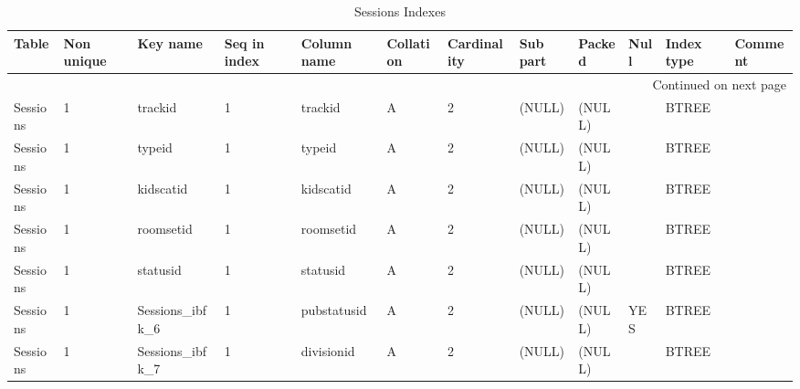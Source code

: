 \documentclass[tablesignature,landscape]{scrartcl}
\begin{document}
\begin{longtable}{|l|l|l|l|l|l|l|l|l|l|l|l|}
\caption{Sessions Indexes} \label{tbl:sessionsindexes}\\
\hline
 Table     &  Non unique  &  Key name               &  Seq in index  &  Column name  &  Collation  &  Cardinality  &  Sub part  &  Packed  &  Null  &  Index type  &  Comment \\
\hline
\endhead
\hline\multicolumn{12}{r}{Continued on next page}\
\endfoot
\endlastfoot
\hline
 Sessions  &           0  &  PRIMARY                &             1  &  sessionid    &  A          &            2  &  (NULL)    &  (NULL)  &        &  BTREE       &           \\
 Sessions  &           1  &  trackid                &             1  &  trackid      &  A          &            2  &  (NULL)    &  (NULL)  &        &  BTREE       &           \\
 Sessions  &           1  &  typeid                 &             1  &  typeid       &  A          &            2  &  (NULL)    &  (NULL)  &        &  BTREE       &           \\
 Sessions  &           1  &  kidscatid              &             1  &  kidscatid    &  A          &            2  &  (NULL)    &  (NULL)  &        &  BTREE       &           \\
 Sessions  &           1  &  roomsetid              &             1  &  roomsetid    &  A          &            2  &  (NULL)    &  (NULL)  &        &  BTREE       &           \\
 Sessions  &           1  &  statusid               &             1  &  statusid     &  A          &            2  &  (NULL)    &  (NULL)  &        &  BTREE       &           \\
 Sessions  &           1  &  Sessions\_{}ibfk\_{}6  &             1  &  pubstatusid  &  A          &            2  &  (NULL)    &  (NULL)  &  YES   &  BTREE       &           \\
 Sessions  &           1  &  Sessions\_{}ibfk\_{}7  &             1  &  divisionid   &  A          &            2  &  (NULL)    &  (NULL)  &        &  BTREE       &           \\
\hline
\end{longtable}
\end{document}
